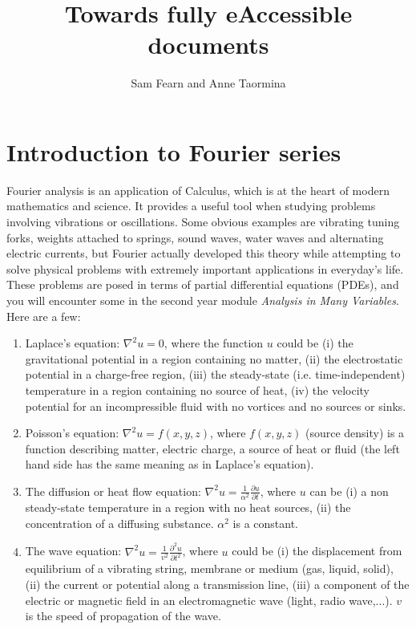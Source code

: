 \documentclass[12pt]{article}
\title{Towards fully eAccessible documents}
\author{Sam Fearn and Anne Taormina}
\numberwithin{equation}{section}
\begin{document}
\date{}
\maketitle
\tableofcontents

\section{Introduction to Fourier series}

Fourier analysis is an application of Calculus, which is at the heart of modern mathematics and science.  It provides a useful tool when studying problems involving vibrations or oscillations. Some obvious examples are vibrating tuning forks, weights attached to springs, sound waves, water waves and alternating electric currents, but Fourier actually developed this theory while attempting to solve physical problems with extremely important applications in everyday's life. These problems are posed in terms of partial differential equations (PDEs), and you will encounter some in the second year module {\em Analysis in Many Variables}. Here are a few: 
\begin{enumerate}
\item Laplace's equation: $\nabla ^2u=0$, where the function $u$ could be (i) the gravitational potential in a region containing no matter, (ii) the electrostatic potential in a charge-free region, (iii) the steady-state (i.e. time-independent) temperature in a region containing no source of heat, (iv) the velocity potential
for an incompressible fluid with no vortices and no sources or sinks.
\item Poisson's equation: $\nabla^2u=f(x,y,z)$, where $f(x,y,z)$ (source density)  is a function describing matter, electric charge, a source of heat or fluid (the left hand side has the same meaning as in  Laplace's equation).
\item The diffusion or heat flow equation: $\nabla^2u=\frac{1}{\alpha^2}\frac{\partial u}{\partial t}$, where $u$ can be (i) a non steady-state temperature in a region with no heat sources, (ii) the concentration of a diffusing substance. $\alpha^2$ is a constant.
\item The wave equation: $\nabla^2u=\frac{1}{v^2}\frac{\partial^2 u}{\partial t^2}$, where $u$ could be (i) the displacement from equilibrium of  a vibrating string, membrane or medium (gas, liquid, solid), (ii) the current or potential along a transmission line, (iii) a component of the electric or magnetic field in an electromagnetic wave (light, radio wave,...). $v$ is the speed of propagation of the wave.
\end{enumerate}
\end{document}
